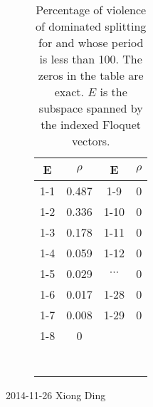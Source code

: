 \begin{description}
  \begin{table}[h]
    \centering
    \begin{tabular}{c  c | c c}
      E & $\rho$ & E & $\rho$  \\ \hline
      1-1  &     0.487   &   1-9  &           0 \\
      1-2  &     0.336   &   1-10  &          0 \\
      1-3  &     0.178   &   1-11  &          0 \\
      1-4  &     0.059   &   1-12  &          0 \\
      1-5  &     0.029   &   $\cdots$ & 0       \\
      1-6  &     0.017   &   1-28  &          0 \\
      1-7  &     0.008   &   1-29  &          0 \\
      1-8  &     0       &         &            \\
       \\
       \\
       \\
       \\
         \\
       \\
       \\
    \end{tabular}
    \caption{Percentage of violence of dominated splitting for
       and  whose period is less than 100.
      The zeros in the table are exact. $E$ is the subspace spanned
      by the indexed Floquet vectors.
    }
    \label{tab:dominated_splitting}
  \end{table}

\item[2014-11-26 Xiong Ding]


\end{description}
